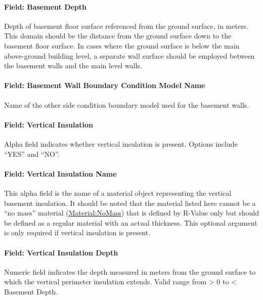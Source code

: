 \paragraph{Field: Basement Depth}\label{field-basement-depth}

Depth of basement floor surface referenced from the ground surface, in meters. This domain should be the distance from the ground surface down to the basement floor surface. In cases where the ground surface is below the main above-ground building level, a separate wall surface should be employed between the basement walls and the main level walls.

\paragraph{Field: Basement Wall Boundary Condition Model Name}\label{field-basement-wall-boundary-condition-model-name}

Name of the other side condition boundary model used for the basement walls.

\paragraph{Field: Vertical Insulation}\label{field-vertical-insulation-1}

Alpha field indicates whether vertical insulation is present. Options include ``YES'' and ``NO''.

\paragraph{Field: Vertical Insulation Name}\label{field-vertical-insulation-name-1}

This alpha field is the name of a material object representing the vertical basement insulation. It should be noted that the material listed here cannot be a ``no mass'' material (\hyperref[materialnomass]{Material:NoMass}) that is defined by R-Value only but should be defined as a regular material with an actual thickness. This optional argument is only required if vertical insulation is present.

\paragraph{Field: Vertical Insulation Depth}\label{field-vertical-insulation-depth-1}

Numeric field indicates the depth measured in meters from the ground surface to which the vertical perimeter insulation extends. Valid range from \textgreater{} 0 to \textless{} Basement Depth.


